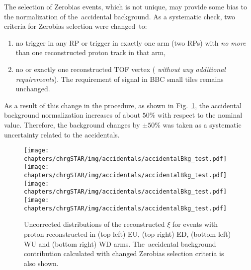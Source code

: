 The selection of Zerobias events, which is not unique, may provide some bias to the normalization of the~accidental background. As a systematic check, two criteria for  Zerobias selection were changed~to:
 \begin{enumerate}
 	\item no trigger in any RP or trigger in exactly one arm (two RPs) with \textit{no more} than one reconstructed proton track in that arm,
 	\item no  or exactly one reconstructed TOF vertex (%
 	\textit{without any additional requirements}). The requirement of signal in BBC small tiles remains unchanged. 
 \end{enumerate}
 As a result of this change in the procedure, as shown in Fig.~\ref{fig:STARaccidentalsXiSyst}, the accidental background normalization increases of about $50\%$ with respect to the nominal value. Therefore, the background changes by $\pm50\%$ was taken as a systematic uncertainty related to the accidentals.
 
 \begin{figure}[h!]
 	\centering
 	\texttt{[image: chapters/chrgSTAR/img/accidentals/accidentalBkg\_test.pdf]}
 	\texttt{[image: chapters/chrgSTAR/img/accidentals/accidentalBkg\_test.pdf]}
 	\texttt{[image: chapters/chrgSTAR/img/accidentals/accidentalBkg\_test.pdf]}
 	\texttt{[image: chapters/chrgSTAR/img/accidentals/accidentalBkg\_test.pdf]}
 	\caption{Uncorrected distributions of the reconstructed $\xi$ for events with proton reconstructed in (top left) EU, (top right) ED, (bottom left) WU and (bottom right) WD arms. The~accidental background contribution calculated with changed Zerobias selection criteria is also shown.}
 	\label{fig:STARaccidentalsXiSyst}
 \end{figure}




